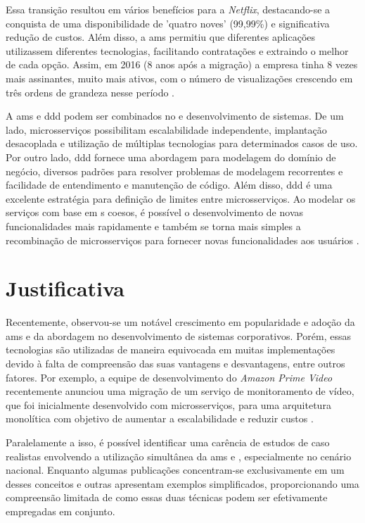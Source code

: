 Essa transição resultou em vários benefícios para a \emph{Netflix}, destacando-se a conquista de uma disponibilidade de 'quatro noves' (99,99\%) e significativa redução de custos. Além disso, a \acrfull{ams} permitiu que diferentes aplicações utilizassem diferentes tecnologias, facilitando contratações e extraindo o melhor de cada opção. Assim, em 2016 (8 anos após a migração) a empresa tinha 8 vezes mais assinantes, muito mais ativos, com o número de visualizações crescendo em três ordens de grandeza nesse período \cite{netflixMigration}.

A \acrfull{ams} e \acrshort{ddd} podem ser combinados no  e desenvolvimento de sistemas. De um lado, microsserviços possibilitam escalabilidade independente, implantação desacoplada e utilização de múltiplas tecnologias para determinados casos de uso. Por outro lado, \acrshort{ddd} fornece uma abordagem para modelagem do domínio de negócio, diversos padrões para resolver problemas de modelagem recorrentes e facilidade de entendimento e manutenção de código. Além disso, \acrshort{ddd} é uma excelente estratégia para definição de limites entre microsserviços. Ao modelar os serviços com base em s coesos, é possível o desenvolvimento de novas funcionalidades mais rapidamente e também se torna mais simples a recombinação de microsserviços para fornecer novas funcionalidades aos usuários \cite{buildingMicroservices}.

\section{Justificativa}

Recentemente, observou-se um notável crescimento em popularidade e adoção da \acrshort{ams} e da abordagem  no desenvolvimento de sistemas corporativos. Porém, essas tecnologias são utilizadas de maneira equivocada em muitas implementações devido à falta de compreensão das suas vantagens e desvantagens, entre outros fatores. Por exemplo, a equipe de desenvolvimento do \emph{Amazon Prime Video} recentemente anunciou uma migração de um serviço de monitoramento de vídeo, que foi inicialmente desenvolvido com microsserviços, para uma arquitetura monolítica com objetivo de aumentar a escalabilidade e reduzir custos \cite{amazonBackMigration}.

Paralelamente a isso, é possível identificar uma carência de estudos de caso realistas envolvendo a utilização simultânea da \acrshort{ams} e , especialmente no cenário nacional.  Enquanto algumas publicações concentram-se exclusivamente em um desses conceitos e outras apresentam exemplos simplificados, proporcionando uma compreensão limitada de como essas duas técnicas podem ser efetivamente empregadas em conjunto. 

